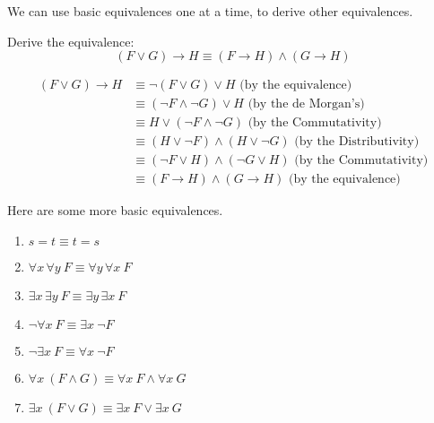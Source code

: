 \begin{note}
We can use basic equivalences one at a time, to derive other equivalences.
\end{note}

\begin{exmp}
Derive the equivalence: $$(F\vee G)\to H \equiv (F\to H) \wedge (G\to H)$$
\end{exmp}

\begin{solution}
\begin{align*}
    (F\vee G)\to H & \equiv \neg (F\vee G) \vee H  \text{ (by the equivalence)}\\
    & \equiv (\neg F \wedge \neg G) \vee H  \text{ (by the de Morgan's)}\\
    & \equiv H \vee (\neg F \wedge \neg G)  \text{ (by the Commutativity)}\\
    & \equiv (H\vee \neg F) \wedge (H\vee \neg G)  \text{ (by the Distributivity)}\\
    & \equiv (\neg F \vee H) \wedge (\neg G \vee H)  \text{ (by the Commutativity)}\\
    & \equiv (F\to H) \wedge (G\to H)  \text{ (by the equivalence)}
\end{align*}
\end{solution}

\begin{defn}
Here are some more basic equivalences.
\begin{enumerate}
\item $s=t \equiv t=s$
\item $\forall x\, \forall y\ F\equiv \forall y\, \forall x\ F$
\item $\exists x\, \exists y\ F\equiv \exists y\, \exists x\ F$
\item $\neg \forall x\ F \equiv \exists x\ \neg F$
\item $\neg \exists x\ F \equiv \forall x\ \neg F$
\item $\forall x\ (F\wedge G) \equiv \forall x\ F \wedge \forall x\ G$
\item $\exists x\ (F\vee G) \equiv \exists x\ F\vee \exists x\ G$
\end{enumerate}
\end{defn}



